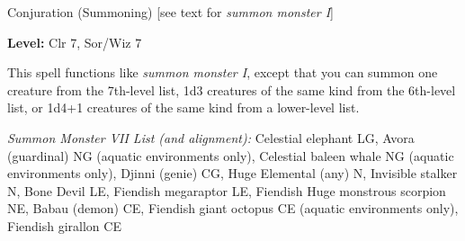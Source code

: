 
Conjuration (Summoning) [see text for \textit{summon monster I}]

\textbf{Level:} Clr 7, Sor/Wiz 7

This spell functions like \textit{summon monster I}, except that you can summon 
one creature from the 7th-level list, 1d3 creatures of the same kind from the 6th-level 
list, or 1d4+1 creatures of the same kind from a lower-level list.

\textit{Summon Monster VII List (and alignment):} Celestial elephant LG, Avora (guardinal) NG (aquatic environments only), Celestial baleen whale NG (aquatic environments only), Djinni (genie) CG, Huge Elemental (any) N, Invisible stalker N, Bone Devil LE, Fiendish megaraptor LE, Fiendish Huge monstrous scorpion NE, Babau (demon) CE, Fiendish giant octopus CE (aquatic environments only), Fiendish girallon CE
